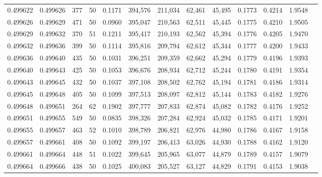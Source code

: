 \begin{tabular}{rrrrrrrrrrrrr}
0.499622 & 0.499626 & 377 &  50 &                                     0.1171 & 394,576 & 211,034 &  62,461 &  45,495 & 0.1773 & 0.4214 & 1.9548 \\
0.499626 & 0.499629 & 471 &  50 &                                     0.0960 & 395,047 & 210,563 &  62,511 &  45,445 & 0.1775 & 0.4210 & 1.9505 \\
0.499629 & 0.499632 & 370 &  51 &                                     0.1211 & 395,417 & 210,193 &  62,562 &  45,394 & 0.1776 & 0.4205 & 1.9470 \\
0.499632 & 0.499636 & 399 &  50 &                                     0.1114 & 395,816 & 209,794 &  62,612 &  45,344 & 0.1777 & 0.4200 & 1.9433 \\
0.499636 & 0.499640 & 435 &  50 &                                     0.1031 & 396,251 & 209,359 &  62,662 &  45,294 & 0.1779 & 0.4196 & 1.9393 \\
0.499640 & 0.499643 & 425 &  50 &                                     0.1053 & 396,676 & 208,934 &  62,712 &  45,244 & 0.1780 & 0.4191 & 1.9354 \\
0.499643 & 0.499645 & 432 &  50 &                                     0.1037 & 397,108 & 208,502 &  62,762 &  45,194 & 0.1781 & 0.4186 & 1.9314 \\
0.499645 & 0.499648 & 405 &  50 &                                     0.1099 & 397,513 & 208,097 &  62,812 &  45,144 & 0.1783 & 0.4182 & 1.9276 \\
0.499648 & 0.499651 & 264 &  62 &                                     0.1902 & 397,777 & 207,833 &  62,874 &  45,082 & 0.1782 & 0.4176 & 1.9252 \\
0.499651 & 0.499655 & 549 &  50 &                                     0.0835 & 398,326 & 207,284 &  62,924 &  45,032 & 0.1785 & 0.4171 & 1.9201 \\
0.499655 & 0.499657 & 463 &  52 &                                     0.1010 & 398,789 & 206,821 &  62,976 &  44,980 & 0.1786 & 0.4167 & 1.9158 \\
0.499657 & 0.499661 & 408 &  50 &                                     0.1092 & 399,197 & 206,413 &  63,026 &  44,930 & 0.1788 & 0.4162 & 1.9120 \\
0.499661 & 0.499664 & 448 &  51 &                                     0.1022 & 399,645 & 205,965 &  63,077 &  44,879 & 0.1789 & 0.4157 & 1.9079 \\
0.499664 & 0.499666 & 438 &  50 &                                     0.1025 & 400,083 & 205,527 &  63,127 &  44,829 & 0.1791 & 0.4153 & 1.9038 \\

\end{tabular}
